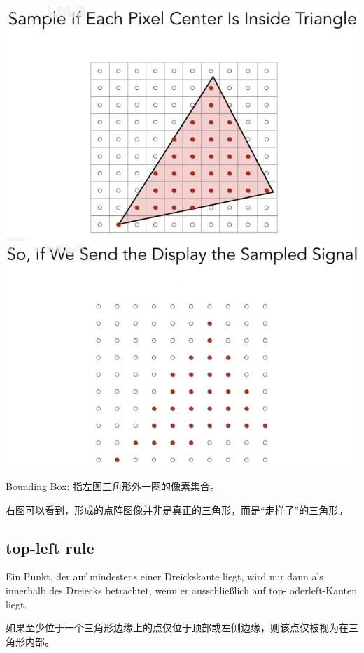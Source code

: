 \documentclass[fleqn]{article}
\begin{document}
\begin{center}
    \includegraphics[scale=0.2]{18.png}
    \includegraphics[scale=0.2]{19.png}
\end{center}

Bounding Box: 指左图三角形外一圈的像素集合。

右图可以看到，形成的点阵图像并非是真正的三角形，而是“走样了”的三角形。

\subsection{top-left rule}

Ein Punkt, der auf mindestens einer Dreickskante liegt, wird nur dann als innerhalb des 
Dreiecks betrachtet, wenn er ausschließlich auf top- oderleft-Kanten liegt.

如果至少位于一个三角形边缘上的点仅位于顶部或左侧边缘，则该点仅被视为在三角形内部。
\end{document}
